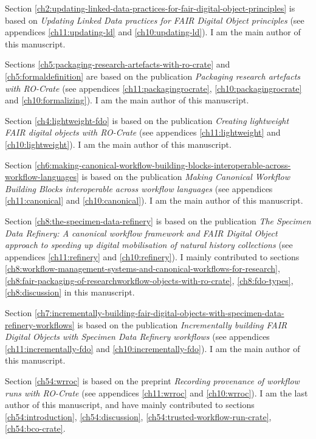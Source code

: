 Section \ref{ch2:updating-linked-data-practices-for-fair-digital-object-principles} is based on \emph{Updating Linked Data practices for FAIR Digital Object principles} \cite{Soiland-Reyes 2022d} (see appendices \ref{ch11:updating-ld} and \ref{ch10:updating-ld}). I am the main author of this manuscript.

Sections \ref{ch5:packaging-research-artefacts-with-ro-crate} and \ref{ch5:formaldefinition} are based on the publication \emph{Packaging research artefacts with RO-Crate} \cite{Soiland-Reyes 2022a} (see appendices \ref{ch11:packagingrocrate}, \ref{ch10:packagingrocrate} and \ref{ch10:formalizing}). I am the main author of this manuscript.

Section \ref{ch4:lightweight-fdo} is based on the publication \emph{Creating lightweight FAIR digital objects with RO-Crate} \cite{Soiland-Reyes 2022c} (see appendices \ref{ch11:lightweight} and \ref{ch10:lightweight}). I am the main author of this manuscript.

Section \ref{ch6:making-canonical-workflow-building-blocks-interoperable-across-workflow-languages} is based on the publication \emph{Making Canonical Workflow Building Blocks interoperable across workflow languages} \cite{Soiland-Reyes 2022b} (see appendices \ref{ch11:canonical} and \ref{ch10:canonical}). I am the main author of this manuscript.

Section \ref{ch8:the-specimen-data-refinery} is based on the publication \emph{The Specimen Data Refinery: A
canonical workflow framework and FAIR Digital Object approach to speeding up digital mobilisation of natural history collections} \cite{Hardisty 2022} (see appendices \ref{ch11:refinery} and \ref{ch10:refinery}). I mainly contributed to sections \ref{ch8:workflow-management-systems-and-canonical-workflows-for-research}, \ref{ch8:fair-packaging-of-researchworkflow-objects-with-ro-crate}, \ref{ch8:fdo-types}, \ref{ch8:discussion} in this manuscript.

Section \ref{ch7:incrementally-building-fair-digital-objects-with-specimen-data-refinery-workflows} is based on the publication \emph{Incrementally building FAIR Digital Objects with Specimen Data
Refinery workflows} \cite{Woolland 2022} (see appendices \ref{ch11:incrementally-fdo} and \ref{ch10:incrementally-fdo}). I am the main author of this manuscript.

Section \ref{ch54:wrroc} is based on the preprint \emph{
Recording provenance of workflow runs with RO-Crate} \cite{Leo 2023b} (see appendices \ref{ch11:wrroc} and \ref{ch10:wrroc}). I am the last author of this manuscript, and have mainly contributed to sections \ref{ch54:introduction}, \ref{ch54:discussion}, \ref{ch54:trusted-workflow-run-crate}, \ref{ch54:bco-crate}.

